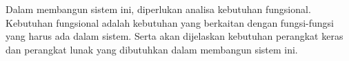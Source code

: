 Dalam membangun sistem ini, diperlukan analisa kebutuhan fungsional. Kebutuhan fungsional adalah kebutuhan yang berkaitan dengan fungsi-fungsi
yang harus ada dalam sistem. Serta akan dijelaskan kebutuhan perangkat keras dan perangkat lunak yang dibutuhkan dalam membangun sistem ini.